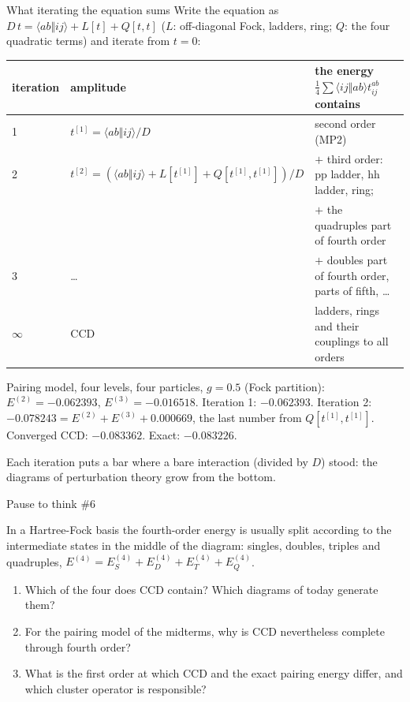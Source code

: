 \documentclass[aspectratio=169,10pt]{beamer}
\newcounter{thinkctr}
\newcommand{\thinkq}[2]{%
  \stepcounter{thinkctr}%
  \vfill
  \begin{tcolorbox}[enhanced,colback=palewarm,colframe=warm,boxrule=1.2pt,arc=4pt,
    grow to left by=6mm,grow to right by=6mm,
    left=16pt,right=16pt,top=16pt,bottom=18pt,
    fonttitle=\bfseries\Large,fontupper=\Large,
    title={Pause to think \#\thethinkctr\hfill\mdseries\normalsize(about #1 min -- discuss with your neighbour)}]
  #2
  \end{tcolorbox}
  \vfill}
\newcommand{\numbox}[1]{%
  \begin{tcolorbox}[colback=palegreen,colframe=teal!70!black,title={\bfseries Measured}]
  #1
  \end{tcolorbox}}
\newcommand{\as}[4]{\langle #1#2\Vert #3#4\rangle}
\begin{document}
\begin{frame}[shrink=4]{What iterating the equation sums}
\small
Write the equation as $D\,t=\as abij+L[t]+Q[t,t]$ ($L$: off-diagonal Fock, ladders, ring; $Q$: the four quadratic terms) and iterate from $t=0$:
\begin{center}
\renewcommand{\arraystretch}{1.35}
\begin{tabular}{lll}
\toprule
iteration & amplitude & the energy $\tfrac14\sum\as ijab t_{ij}^{ab}$ contains\\
\midrule
1 & $t^{[1]}=\as abij/D$ & second order (MP2)\\
2 & $t^{[2]}=(\as abij+L[t^{[1]}]+Q[t^{[1]},t^{[1]}])/D$ & $+$ third order: pp ladder, hh ladder, ring;\\
 & & $+$ the quadruples part of fourth order\\
3 & \dots & $+$ doubles part of fourth order, parts of fifth, \dots\\
$\infty$ & CCD & ladders, rings and their couplings to all orders\\
\bottomrule
\end{tabular}
\end{center}
\numbox{Pairing model, four levels, four particles, $g=0.5$ (Fock partition): $E^{(2)}=-0.062393$, $E^{(3)}=-0.016518$. Iteration 1: $-0.062393$. Iteration 2: $-0.078243=E^{(2)}+E^{(3)}+0.000669$, the last number from $Q[t^{[1]},t^{[1]}]$. Converged CCD: $-0.083362$. Exact: $-0.083226$.}
Each iteration puts a bar where a bare interaction (divided by $D$) stood: the diagrams of perturbation theory grow from the bottom.
\end{frame}

\begin{frame}[shrink=1]{Pause to think \#6}
\thinkq{3}{In a Hartree-Fock basis the fourth-order energy is usually split according to the intermediate states in the middle of the diagram: singles, doubles, triples and quadruples, $E^{(4)}=E^{(4)}_S+E^{(4)}_D+E^{(4)}_T+E^{(4)}_Q$.
\begin{enumerate}
\item Which of the four does CCD contain? Which diagrams of today generate them?
\item For the pairing model of the midterms, why is CCD nevertheless complete through fourth order?
\item What is the first order at which CCD and the exact pairing energy differ, and which cluster operator is responsible?
\end{enumerate}}
\end{frame}
\end{document}
